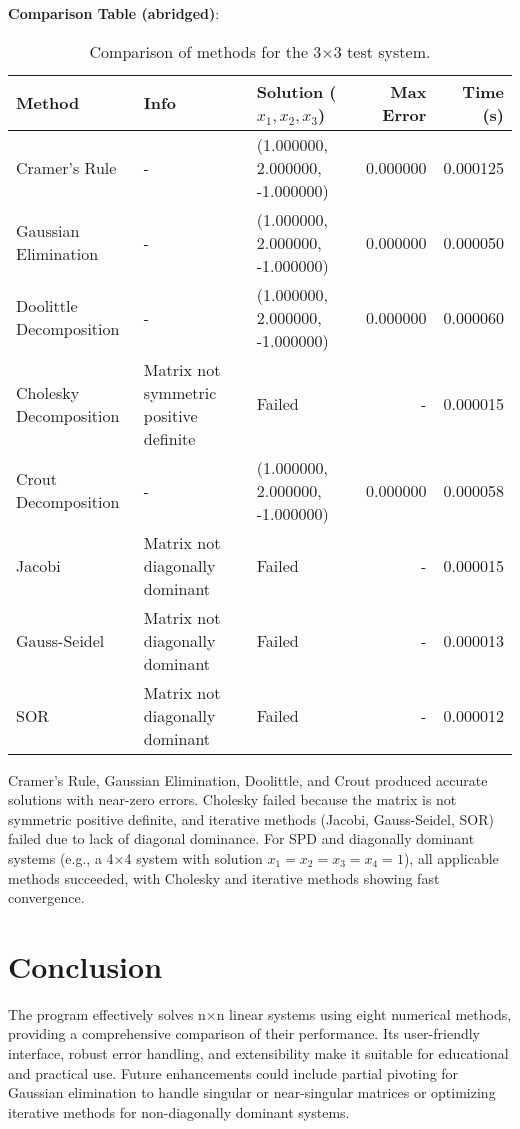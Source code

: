 \documentclass[12pt]{article}
\begin{document}
\textbf{Comparison Table (abridged)}:
\begin{table}[h]
\centering
\begin{tabular}{l l l r r}
\toprule
Method & Info & Solution ($x_1, x_2, x_3$) & Max Error & Time (s) \\
\midrule
Cramer's Rule & - & (1.000000, 2.000000, -1.000000) & 0.000000 & 0.000125 \\
Gaussian Elimination & - & (1.000000, 2.000000, -1.000000) & 0.000000 & 0.000050 \\
Doolittle Decomposition & - & (1.000000, 2.000000, -1.000000) & 0.000000 & 0.000060 \\
Cholesky Decomposition & Matrix not symmetric positive definite & Failed & - & 0.000015 \\
Crout Decomposition & - & (1.000000, 2.000000, -1.000000) & 0.000000 & 0.000058 \\
Jacobi & Matrix not diagonally dominant & Failed & - & 0.000015 \\
Gauss-Seidel & Matrix not diagonally dominant & Failed & - & 0.000013 \\
SOR & Matrix not diagonally dominant & Failed & - & 0.000012 \\
\bottomrule
\end{tabular}
\caption{Comparison of methods for the 3$\times$3 test system.}
\end{table}

Cramer’s Rule, Gaussian Elimination, Doolittle, and Crout produced accurate solutions with near-zero errors. Cholesky failed because the matrix is not symmetric positive definite, and iterative methods (Jacobi, Gauss-Seidel, SOR) failed due to lack of diagonal dominance. For SPD and diagonally dominant systems (e.g., a 4$\times$4 system with solution $x_1 = x_2 = x_3 = x_4 = 1$), all applicable methods succeeded, with Cholesky and iterative methods showing fast convergence.

\section{Conclusion}
The program effectively solves n$\times$n linear systems using eight numerical methods, providing a comprehensive comparison of their performance. Its user-friendly interface, robust error handling, and extensibility make it suitable for educational and practical use. Future enhancements could include partial pivoting for Gaussian elimination to handle singular or near-singular matrices or optimizing iterative methods for non-diagonally dominant systems.
\end{document}
